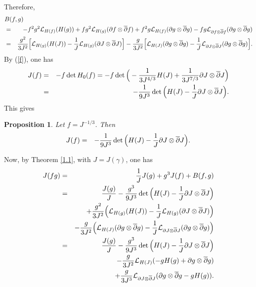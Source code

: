 \documentclass[12pt]{amsart}
\newtheorem{proposition}{Proposition}[section]
\def\d{\partial}
\def\dbar{\overline{\partial}}
\def\d{\partial}
\def\cal{\mathcal}
\begin{document}
Therefore,
\begin{eqnarray*}
\lefteqn{B(f, g)}\\
&=&-f^2 g^2 {\cal L}_{H(f)}(H(g))+f g^2{\cal L}_{H(g)}(\d f\otimes\dbar f)+f^2 g{\cal L}_{H(f)}(\d g\otimes \dbar g)-fg{\cal L}_{\d f\otimes \dbar f}(\d g\otimes \dbar g)\\
&=&  {g^2\over 3J^2}  \Big[{\cal L}_{H(g)}(H(J))-{1\over J} {\cal L}_{H(g)}(\d J\otimes \dbar J)\Big]-{g\over 3 J^2}
\Big[ {\cal L}_{H(J)} (\d g\otimes \dbar g)-{1 \over J} {\cal L}_{\d J\otimes \dbar J}(\d g\otimes \dbar g)\Big].
\end{eqnarray*}
By (\ref{f}), one has
\begin{eqnarray*}
J(f)&=&-f \det H_0(f)=-f \det \Big(-{1\over 3 J^{4/3}} H(J)+{1\over 3 J^{7/3}} \d J \otimes \dbar J\Big)\\
&=&-{1\over  9J^3} \det \Big(H(J)-{1\over J} \d J\otimes \dbar J\Big).
\end{eqnarray*}
This gives
\begin{proposition} Let $f=J^{-1/3}$. Then
\begin{eqnarray}
J(f) %
&=&-{1\over  9J^3} \det \Big(H(J)-{1 \over J} \d J\otimes \dbar J\Big).
\end{eqnarray}
\end{proposition}

Now, by Theorem \ref{1.1}, with $J=J(\gamma)$, one has
\begin{eqnarray}\label{J(fg)}
J(f g)&=&{1\over J} J(g) +g^3 J(f)+B(f, g) \nonumber\\
&=&{J(g) \over J} -{g^3\over 9 J^3} \det \Big(H(J)-{1\over J}\d J\otimes \dbar J\Big) \nonumber \\
&&+ {g^2\over 3J^2}  \Big({\cal L}_{H(g)}(H(J))-{1\over J} {\cal L}_{H(g)}(\d J\otimes \dbar J)\Big) \nonumber\\
&&-{g\over 3 J^2}
\Big( {\cal L}_{H(J)} (\d g\otimes \dbar g)-{1 \over J} {\cal L}_{\d J\otimes \dbar J}(\d g\otimes \dbar g)\Big) \nonumber\\
&=&{J(g) \over J} -{g^3\over 9 J^3} \det \Big(H(J)-{1\over J}\d J\otimes \dbar J\Big) \nonumber \\
&&- {g\over 3J^2}  {\cal L}_{H(J)}( -g H(g)+\d g\otimes \dbar g) \nonumber\\
&&+{g\over 3 J^3}
{\cal L}_{\d J\otimes \dbar J}(\d g\otimes \dbar g -g H(g)).
\end{eqnarray}
\end{document}

